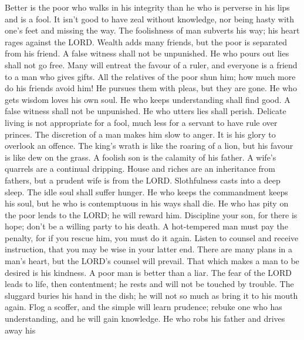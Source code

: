  Better is the poor who walks in his integrity than he who
is perverse in his lips and is a fool.  It isn't good to
have zeal without knowledge, nor being hasty with one's feet and missing
the way.  The foolishness of man subverts his way; his heart
rages against the LORD.  Wealth adds many friends, but the
poor is separated from his friend.  A false witness shall
not be unpunished. He who pours out lies shall not go free. 
Many will entreat the favour of a ruler, and everyone is a friend to a
man who gives gifts.  All the relatives of the poor shun
him; how much more do his friends avoid him! He pursues them with pleas,
but they are gone.  He who gets wisdom loves his own soul.
He who keeps understanding shall find good.  A false witness
shall not be unpunished. He who utters lies shall perish. 
Delicate living is not appropriate for a fool, much less for a servant
to have rule over princes.  The discretion of a man makes
him slow to anger. It is his glory to overlook an offence. 
The king's wrath is like the roaring of a lion, but his favour is like
dew on the grass.  A foolish son is the calamity of his
father. A wife's quarrels are a continual dripping.  House
and riches are an inheritance from fathers, but a prudent wife is from
the LORD.  Slothfulness casts into a deep sleep. The idle
soul shall suffer hunger.  He who keeps the commandment
keeps his soul, but he who is contemptuous in his ways shall die.
 He who has pity on the poor lends to the LORD; he will
reward him.  Discipline your son, for there is hope; don't
be a willing party to his death.  A hot-tempered man must
pay the penalty, for if you rescue him, you must do it again.
 Listen to counsel and receive instruction, that you may be
wise in your latter end.  There are many plans in a man's
heart, but the LORD's counsel will prevail.  That which
makes a man to be desired is his kindness. A poor man is better than a
liar.  The fear of the LORD leads to life, then
contentment; he rests and will not be touched by trouble. 
The sluggard buries his hand in the dish; he will not so much as bring
it to his mouth again.  Flog a scoffer, and the simple will
learn prudence; rebuke one who has understanding, and he will gain
knowledge.  He who robs his father and drives away his
